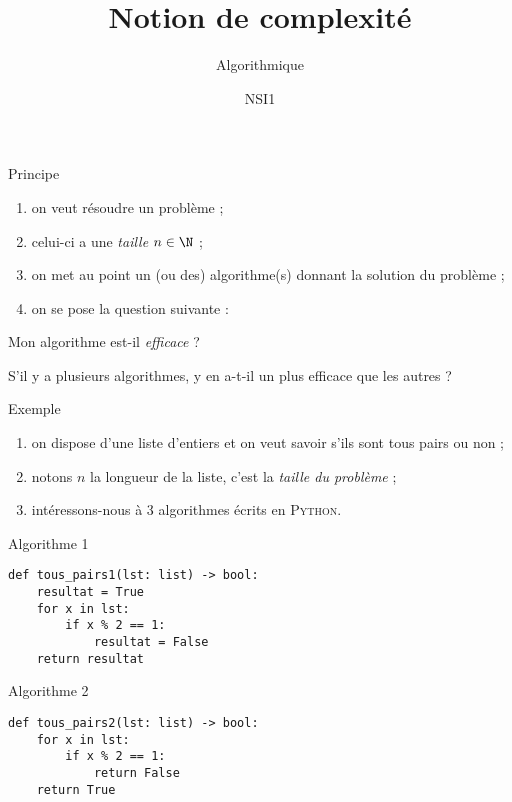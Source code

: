 \documentclass[12pt]{beamer}
\title{Notion de complexité}
\subtitle{Algorithmique}
\author{NSI1}
\begin{document}
\maketitle

\begin{frame}{Principe}
\begin{enumerate}[--]
	\item 	on veut résoudre un problème ;\pause
	\item 	celui-ci a une \textit{taille} $n\in\N$ ;\pause
	\item 	on met au point un (ou des) algorithme(s) donnant la solution du problème ;\pause
	\item   on se pose la question suivante :\pause
\end{enumerate}
Mon algorithme est-il \textit{efficace} ?\\\pause

S'il y a plusieurs algorithmes, y en a-t-il un plus efficace que les autres ?
\end{frame}

\begin{frame}{Exemple}
\begin{enumerate}[\textbullet]
	\item 	on dispose d'une liste d'entiers et on veut savoir s'ils sont tous pairs ou non ;\pause
	\item 	notons $n$ la longueur de la liste, c'est la \textit{taille du problème} ;\pause
	\item 	intéressons-nous à 3 algorithmes écrits en \textsc{Python}.
\end{enumerate}
\end{frame}

\begin{frame}[fragile]{Algorithme 1}
	
\begin{verbatim}
def tous_pairs1(lst: list) -> bool:
    resultat = True
    for x in lst:
        if x % 2 == 1:
            resultat = False
    return resultat
\end{verbatim}
	
\end{frame}

\begin{frame}[fragile]{Algorithme 2}
    
\begin{verbatim}
def tous_pairs2(lst: list) -> bool:
    for x in lst:
        if x % 2 == 1:
            return False
    return True
\end{verbatim}
    
\end{frame}
\end{document}

